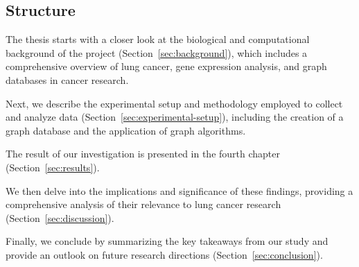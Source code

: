 \subsection{Structure}  \label{subsec:structure}
The thesis starts with a closer look at the biological and computational background of the project (Section~\ref{sec:background}),
which includes a comprehensive overview of lung cancer, gene expression analysis, and graph databases in cancer research.

Next, we describe the experimental setup and methodology employed to collect and analyze data (Section~\ref{sec:experimental-setup}),
including the creation of a graph database and the application of graph algorithms.

The result of our investigation is presented in the fourth chapter (Section~\ref{sec:results}).

We then delve into the implications and significance of these findings,
providing a comprehensive analysis of their relevance to lung cancer research (Section~\ref{sec:discussion}).

Finally, we conclude by summarizing the key takeaways from our study and provide an outlook
on future research directions (Section~\ref{sec:conclusion}).
